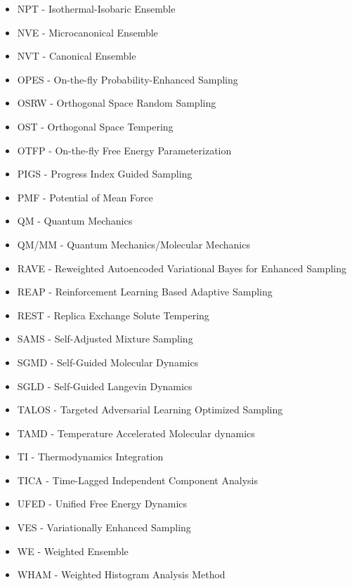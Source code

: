 \documentclass[9pt,review]{livecoms}
\begin{document}
\begin{itemize}
    \item NPT - Isothermal-Isobaric Ensemble
    \item NVE - Microcanonical Ensemble
    \item NVT - Canonical Ensemble
    \item OPES - On-the-fly Probability-Enhanced Sampling
    \item OSRW - Orthogonal Space Random Sampling
    \item OST - Orthogonal Space Tempering
    \item OTFP - On-the-fly Free Energy Parameterization
    \item PIGS - Progress Index Guided Sampling
    \item PMF - Potential of Mean Force
    \item QM - Quantum Mechanics
    \item QM/MM - Quantum Mechanics/Molecular Mechanics
    \item RAVE - Reweighted Autoencoded Variational Bayes for Enhanced Sampling
    \item REAP - Reinforcement Learning Based Adaptive Sampling
    \item REST - Replica Exchange Solute Tempering
    \item SAMS - Self-Adjusted Mixture Sampling
    \item SGMD - Self-Guided Molecular Dynamics 
    \item SGLD - Self-Guided Langevin Dynamics
    \item TALOS - Targeted Adversarial Learning Optimized Sampling
    \item TAMD - Temperature Accelerated Molecular dynamics
    \item TI - Thermodynamics Integration
    \item TICA - Time-Lagged Independent Component Analysis
    \item UFED - Unified Free Energy Dynamics
    \item VES - Variationally Enhanced Sampling
    \item WE - Weighted Ensemble
    \item WHAM - Weighted Histogram Analysis Method
\end{itemize}



\end{document}
